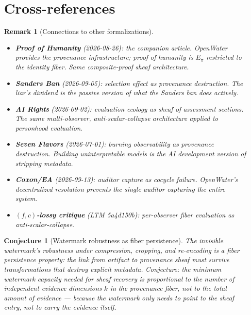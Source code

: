 \documentclass[11pt,a4paper]{article}
\newtheorem{conjecture}[definition]{Conjecture}
\newtheorem{remark}[definition]{Remark}
\begin{document}
\section{Cross-references}

\begin{remark}[Connections to other formalizations]
\begin{itemize}
\item \textbf{Proof of Humanity} (2026-08-26): the companion article.
  OpenWater provides the provenance infrastructure; proof-of-humanity
  is $E_\pi$ restricted to the identity fiber. Same composite-proof
  sheaf architecture.
\item \textbf{Sanders Ban} (2026-09-05): selection effect as provenance
  destruction. The liar's dividend is the passive version of what the
  Sanders ban does actively.
\item \textbf{AI Rights} (2026-09-02): evaluation ecology as sheaf of
  assessment sections. The same multi-observer, anti-scalar-collapse
  architecture applied to personhood evaluation.
\item \textbf{Seven Flavors} (2026-07-01): burning observability as
  provenance destruction. Building uninterpretable models is the AI
  development version of stripping metadata.
\item \textbf{Coxon/EA} (2026-09-13): auditor capture as cocycle
  failure. OpenWater's decentralized resolution prevents the single
  auditor capturing the entire system.
\item \textbf{$(f,c)$-lossy critique} (LTM 5a4d150b): per-observer
  fiber evaluation as anti-scalar-collapse.
\end{itemize}
\end{remark}

\begin{conjecture}[Watermark robustness as fiber persistence]
The invisible watermark's robustness under compression, cropping, and
re-encoding is a fiber persistence property: the link from artifact
to provenance sheaf must survive transformations that destroy explicit
metadata. Conjecture: the minimum watermark capacity needed for sheaf
recovery is proportional to the number of independent evidence dimensions
$k$ in the provenance fiber, not to the total amount of evidence ---
because the watermark only needs to point to the sheaf entry, not to
carry the evidence itself.
\end{conjecture}
\end{document}
